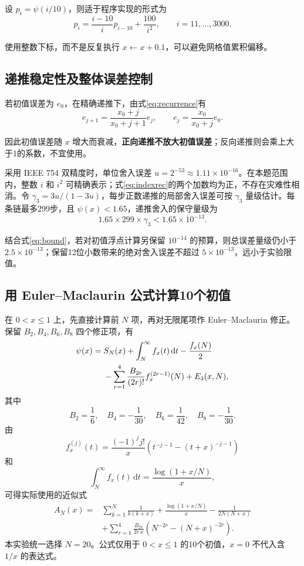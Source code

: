 \documentclass[UTF8,fontset=fandol,zihao=-4,a4paper]{ctexart}
\newcommand{\psif}{\psi}
\newcommand{\dd}{\mathrm{d}}
\begin{document}
设 $p_i=\psif(i/10)$，则适于程序实现的形式为
\begin{equation}\label{eq:indexrec}
 \boxed{p_i=\frac{i-10}{i}p_{i-10}+\frac{100}{i^2},
 \qquad i=11,\ldots,3000.}
\end{equation}

使用整数下标，而不是反复执行 $x\leftarrow x+0.1$，可以避免网格值累积偏移。

\subsection{递推稳定性及整体误差控制}
若初值误差为 $e_0$，在精确递推下，由式\eqref{eq:recurrence}有
\[
 e_{j+1}=\frac{x_0+j}{x_0+j+1}e_j,
 \qquad e_j=\frac{x_0}{x_0+j}e_0.
\]

因此初值误差随 $x$ 增大而衰减，\textbf{正向递推不放大初值误差}；反向递推则会乘上大于1的系数，不宜使用。

采用 IEEE 754 双精度时，单位舍入误差 $u=2^{-53}\approx1.11\times10^{-16}$。在本题范围内，整数 $i$ 和 $i^2$ 可精确表示；式\eqref{eq:indexrec}的两个加数均为正，不存在灾难性相消。令 $\gamma_3=3u/(1-3u)$，每步正数递推的局部舍入误差可按 $\gamma_3$ 量级估计。每条链最多299步，且 $\psif(x)<1.65$，递推舍入的保守量级为
\[
 1.65\times299\times\gamma_3<1.65\times10^{-13}.
\]

结合式\eqref{eq:bound}，若对初值浮点计算另保留 $10^{-14}$ 的预算，则总误差量级仍小于 $2.5\times10^{-13}$；保留12位小数带来的绝对舍入误差不超过 $5\times10^{-13}$，远小于实验限值。


\subsection{用 Euler--Maclaurin 公式计算10个初值}
在 $0<x\le1$ 上，先直接计算前 $N$ 项，再对无限尾项作 Euler--Maclaurin 修正。保留 $B_2,B_4,B_6,B_8$ 四个修正项，有
\begin{align}
 \psif(x)
 ={}&S_N(x)+\int_N^{\infty}f_x(t)\,\dd t-\frac{f_x(N)}2\notag\\
 &-\sum_{r=1}^{4}\frac{B_{2r}}{(2r)!}f_x^{(2r-1)}(N)
 +E_4(x,N),\label{eq:EMgeneral}
\end{align}
其中
\[
 B_2=\frac16,\quad B_4=-\frac1{30},\quad
 B_6=\frac1{42},\quad B_8=-\frac1{30}.
\]
由
\[
 f_x^{(j)}(t)=\frac{(-1)^j j!}{x}
 \left(t^{-j-1}-(t+x)^{-j-1}\right)
\]
和
\[
 \int_N^{\infty}f_x(t)\,\dd t=\frac{\log(1+x/N)}{x},
\]
可得实际使用的近似式
\begin{equation}\label{eq:EMexplicit}
 \boxed{\begin{aligned}
 A_N(x)={}&\sum_{k=1}^{N}\frac1{k(k+x)}
 +\frac{\log(1+x/N)}{x}-\frac1{2N(N+x)}\\
 &+\sum_{r=1}^{4}\frac{B_{2r}}{2r\,x}
 \left(N^{-2r}-(N+x)^{-2r}\right).
 \end{aligned}}
\end{equation}
本实验统一选择 $\boxed{N=20}$。公式仅用于 $0<x\le1$ 的10个初值，$x=0$ 不代入含 $1/x$ 的表达式。
\end{document}
